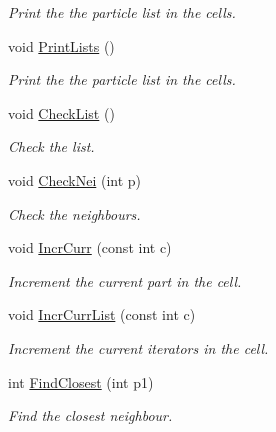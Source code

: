 \begin{DoxyCompactItemize}
\begin{DoxyCompactList}\small\item\em \-Print the the particle list in the cells. \end{DoxyCompactList}\item 
\hypertarget{classDdLinkedList_aff89725be8d743f07f318ef0c06858e1}{void \hyperlink{classDdLinkedList_aff89725be8d743f07f318ef0c06858e1}{\-Print\-Lists} ()}\label{classDdLinkedList_aff89725be8d743f07f318ef0c06858e1}

\begin{DoxyCompactList}\small\item\em \-Print the the particle list in the cells. \end{DoxyCompactList}\item 
\hypertarget{classDdLinkedList_a4e589206ab9bc4752d547111d6bba6e7}{void \hyperlink{classDdLinkedList_a4e589206ab9bc4752d547111d6bba6e7}{\-Check\-List} ()}\label{classDdLinkedList_a4e589206ab9bc4752d547111d6bba6e7}

\begin{DoxyCompactList}\small\item\em \-Check the list. \end{DoxyCompactList}\item 
\hypertarget{classDdLinkedList_ad6d4b1b657a39ed64c2c45d4706dbcc1}{void \hyperlink{classDdLinkedList_ad6d4b1b657a39ed64c2c45d4706dbcc1}{\-Check\-Nei} (int p)}\label{classDdLinkedList_ad6d4b1b657a39ed64c2c45d4706dbcc1}

\begin{DoxyCompactList}\small\item\em \-Check the neighbours. \end{DoxyCompactList}\item 
void \hyperlink{classDdLinkedList_ab61672aad0bc83dc07c8efd5a4543fc7}{\-Incr\-Curr} (const int c)
\begin{DoxyCompactList}\small\item\em \-Increment the current part in the cell. \end{DoxyCompactList}\item 
void \hyperlink{classDdLinkedList_a0c040f6773c460a8eb46bff752c08d2d}{\-Incr\-Curr\-List} (const int c)
\begin{DoxyCompactList}\small\item\em \-Increment the current iterators in the cell. \end{DoxyCompactList}\item 
\hypertarget{classDdLinkedList_a0d08a6310d088c729b6b1e496203a3d9}{int \hyperlink{classDdLinkedList_a0d08a6310d088c729b6b1e496203a3d9}{\-Find\-Closest} (int p1)}\label{classDdLinkedList_a0d08a6310d088c729b6b1e496203a3d9}

\begin{DoxyCompactList}\small\item\em \-Find the closest neighbour. \end{DoxyCompactList}\end{DoxyCompactItemize}
